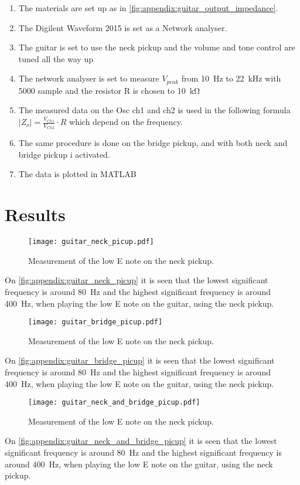 \begin{enumerate}
\item The materials are set up as in \autoref{fig:appendix:guitar_output_impedance}.
\item The Digilent Waveform 2015 is set as a Network analyser.
\item  The guitar is set to use the neck pickup and the volume and tone control are tuned all the way up
\item  The network analyser is set to measure $V_{peak}$ from \SI{10}{\hertz} to \SI{22}{\kilo\hertz} with 5000 sample and the resistor R is chosen to \SI{10}{\kilo\ohm}
\item The measured data on the Osc ch1 and ch2 is used in the following formula $\left | Z_o \right | = \frac{V_{Ch1}}{V_{Ch2}}\cdot R$ which depend on the frequency. 
\item The same procedure is done on the bridge pickup, and with both neck and bridge pickup i activated.
\item The data is plotted in MATLAB
\end{enumerate}

\section*{Results}

\begin{figure}[htbp!]
	\centering
		\texttt{[image: guitar\_neck\_picup.pdf]}
		\caption{Measurement of the low E note on the neck pickup.}
		\label{fig:appendix:guitar_neck_picup}
\end{figure}

On  \autoref{fig:appendix:guitar_neck_picup} it is seen that the lowest significant frequency is around \SI{80}{\hertz} and the highest significant frequency is around \SI{400}{\hertz}, when playing the low E note on the guitar, using the neck pickup.

\begin{figure}[htbp!]
	\centering
		\texttt{[image: guitar\_bridge\_picup.pdf]}
		\caption{Measurement of the low E note on the neck pickup.}
		\label{fig:appendix:guitar_bridge_picup}
\end{figure}

On  \autoref{fig:appendix:guitar_bridge_picup} it is seen that the lowest significant frequency is around \SI{80}{\hertz} and the highest significant frequency is around \SI{400}{\hertz}, when playing the low E note on the guitar, using the neck pickup.

\begin{figure}[htbp!]
	\centering
		\texttt{[image: guitar\_neck\_and\_bridge\_picup.pdf]}
		\caption{Measurement of the low E note on the neck pickup.}
		\label{fig:appendix:guitar_neck_and_bridge_picup}
\end{figure}

On  \autoref{fig:appendix:guitar_neck_and_bridge_picup} it is seen that the lowest significant frequency is around \SI{80}{\hertz} and the highest significant frequency is around \SI{400}{\hertz}, when playing the low E note on the guitar, using the neck pickup.
